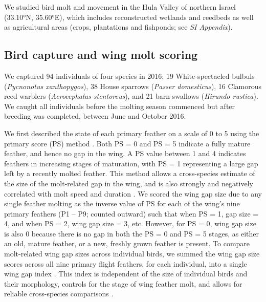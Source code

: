 \begin{refsection}
We studied bird molt and movement in the Hula Valley of northern Israel (33.10°N, 35.60°E), which includes reconstructed wetlands and reedbeds as well as agricultural areas (crops, plantations and fishponds; see \textit{SI Appendix}).

\subsection*{Bird capture and wing molt scoring}

We captured 94 individuals of four species in 2016: 19 White-spectacled bulbuls (\textit{Pycnonotus xanthopygos}), 38 House sparrows (\textit{Passer domesticus}), 16 Clamorous reed warblers (\textit{Acrocephalus stentoreus}), and 21 barn swallows (\textit{Hirundo rustica}).
We caught all individuals before the molting season commenced but after breeding was completed, between June and October 2016.

We first described the state of each primary feather on a scale of 0 to 5 using the primary score (PS) method \citep{ginn1983}.
Both PS = 0 and PS = 5 indicate a fully mature feather, and hence no gap in the wing.
A PS value between 1 and 4 indicates feathers in increasing stages of maturation, with PS = 1 representing a large gap left by a recently molted feather.
This method allows a cross-species estimate of the size of the molt-related gap in the wing, and is also strongly and negatively correlated with molt speed and duration \citep{rohwer2009}.
We scored the wing gap size due to any single feather molting as the inverse value of PS for each of the wing's nine primary feathers (P1 -- P9; counted outward) such that when PS = 1, gap size = 4, and when PS = 2, wing gap size = 3, etc.
However, for PS = 0, wing gap size is also 0 because there is no gap in both the PS = 0 and PS = 5 stages, as either an old, mature feather, or a new, freshly grown feather is present.
To compare molt-related wing gap sizes across individual birds, we summed the wing gap size scores across all nine primary flight feathers, for each individual, into a single wing gap index \citep{kiat2016}.
This index is independent of the size of individual birds and their morphology, controls for the stage of wing feather molt, and allows for reliable cross-species comparisons \citep{bensch1993,kiat2016}.


\end{refsection}
